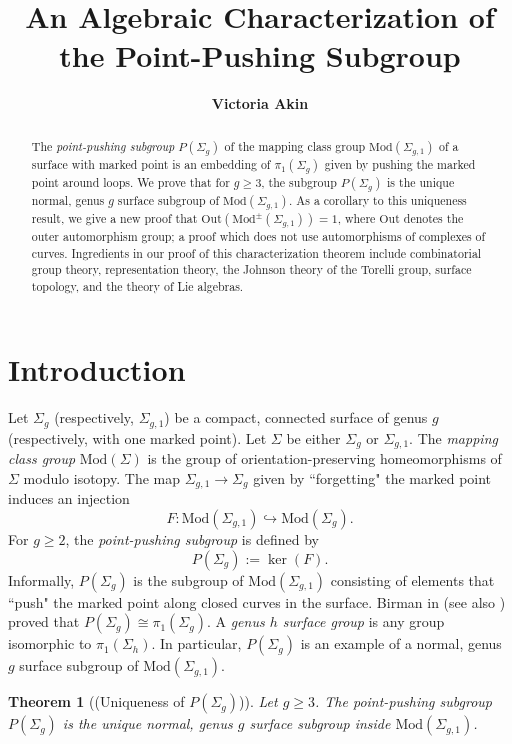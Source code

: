 \documentclass[a4paper]{amsproc}
\title[An Algebraic Characterization of the Point-Pushing Subgroup]{An Algebraic Characterization of the Point-Pushing Subgroup}
\author[Akin]{\bfseries Victoria Akin}
\theoremstyle{TheoremNum}
\theoremstyle{Theorembold}
\newtheorem{thm}{Theorem}[section]
\theoremstyle{TheoremboldDef}
\theoremstyle{TheoremboldRem}
\theoremstyle{TheoremboldRem}
\begin{document}
\vspace{18mm} \setcounter{page}{1} \thispagestyle{empty}

\begin{abstract}
The \emph{point-pushing subgroup} $P({\Sigma_{g}})$ of the mapping class group ${\text{Mod}(\Sigma_{g,1})}$ of a surface with marked point is an embedding of ${\pi_1(\Sigma_g)}$ given by pushing the marked point around loops. We prove that for $g{\geqslant} 3$, the subgroup $P({\Sigma_{g}})$ is the unique normal, genus $g$ surface subgroup of ${\text{Mod}(\Sigma_{g,1})}$. As a corollary to this uniqueness result, we give a new proof that $\text{Out}(\text{Mod}^\pm(\Sigma_{g,1}))=1$, where $\text{Out}$ denotes the outer automorphism group; a proof which does not use automorphisms of complexes of curves. Ingredients in our proof of this characterization theorem include combinatorial group theory, representation theory, the Johnson theory of the Torelli group, surface topology, and the theory of Lie algebras.
\end{abstract}

\maketitle

\section*{Introduction}
Let $\Sigma_{g}$ (respectively, $\Sigma_{g,1}$) be a compact, connected surface of genus $g$ (respectively, with one marked point). Let $\Sigma$ be either $\Sigma_g$ or $\Sigma_{g,1}$. The \emph{mapping class group} ${\text{Mod}(\Sigma)}$ is the group of orientation-preserving homeomorphisms of $\Sigma$ modulo isotopy. The map ${\Sigma_{g,1}}\to{\Sigma_{g}}$ given by ``forgetting" the marked point induces an injection \[F: {\text{Mod}(\Sigma_{g,1})}\hookrightarrow{\text{Mod}(\Sigma_g)}.\] For $g{\geqslant} 2$, the \emph{point-pushing subgroup} is defined by \[P({\Sigma_{g}}):= \ker(F).\] Informally, $P({\Sigma_{g}})$ is the subgroup of ${\text{Mod}(\Sigma_{g,1})}$ consisting of elements that ``push" the marked point along closed curves in the surface. Birman in \cite{birmancraggs} (see also \cite{birman2}) proved that $P({\Sigma_{g}})\cong{\pi_1(\Sigma_g)}$. A \emph{genus $h$ surface group} is any group isomorphic to $\pi_1(\Sigma_h)$. In particular, $P({\Sigma_{g}})$ is an example of a normal, genus $g$ surface subgroup of ${\text{Mod}(\Sigma_{g,1})}$.
\begin{thm}[(Uniqueness of $P({\Sigma_{g}})$)]\label{maintheorem}
Let $g{\geqslant} 3$. The point-pushing subgroup $P({\Sigma_{g}})$ is the unique normal, genus $g$ surface subgroup inside ${\text{Mod}(\Sigma_{g,1})}$.
\end{thm}
\end{document}
